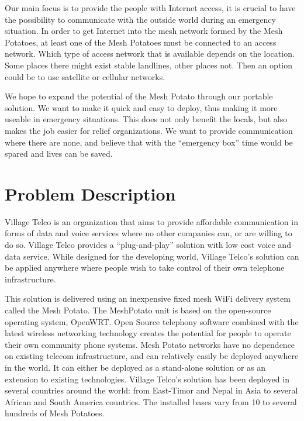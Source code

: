 Our main focus is to provide the people with Internet access, it is crucial to have the possibility to communicate with the outside world during an emergency situation. In order to get Internet into the mesh network formed by the Mesh Potatoes, at least one of the Mesh Potatoes must be connected to an access network. Which type of access network that is available depends on the location. Some places there might exist stable landlines, other places not. Then an option could be to use satellite or cellular networks. 

We hope to expand the potential of the Mesh Potato through our portable solution. We want to make it quick and easy to deploy, thus making it more useable in emergency situations. This does not only benefit the locals, but also makes the job easier for relief organizations. 
We want to provide communication where there are none,  and believe that with the “emergency box” time would be spared and lives can be saved.

\section{Problem Description}
Village Telco is an organization that aims to provide affordable communication in forms of data and voice services where no other companies can, or are willing to do so. Village Telco provides a “plug-and-play” solution with low cost voice and data service. While designed for the developing world, Village Telco’s solution can be applied anywhere where people wish to take control of their own telephone infrastructure.

This solution is delivered using an inexpensive fixed mesh WiFi delivery system called the Mesh Potato. The MeshPotato unit is based on the open-source operating system, OpenWRT. Open Source telephony software combined with the latest wireless networking technology creates the potential for people to operate their own community phone systems. Mesh Potato networks have no dependence on existing telecom infrastructure, and can relatively easily be deployed anywhere in the world. It can either be deployed as a stand-alone solution or as an extension to existing technologies. Village Telco’s solution has been deployed in several countries around the world: from East-Timor and Nepal in Asia to several African and South America countries. The installed bases vary from 10 to several hundreds of Mesh Potatoes. 

